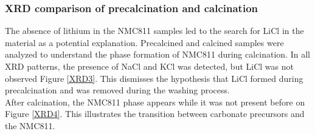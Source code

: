 \documentclass{article}
\begin{document}
\subsubsection{XRD comparison of precalcination and calcination}
The absence of lithium in the NMC811 samples led to the search for LiCl in the material as a potential explanation.
Precalcined and calcined samples were analyzed to understand the phase formation of NMC811 during calcination. 
In all XRD patterns, the presence of NaCl and KCl was detected, but LiCl was not observed Figure \ref{XRD3}.
 This dismisses the hypothesis that LiCl formed during precalcination and was removed during the washing process. \\
After calcination, the NMC811 phase appears while it was not present before on Figure \ref{XRD4}. This illustrates the transition between carbonate precursors and the NMC811.\\
\end{document}
